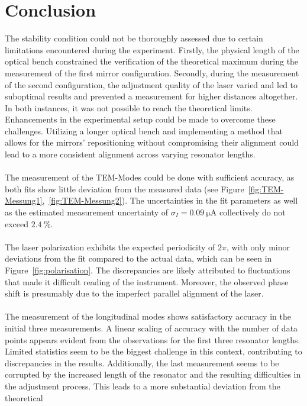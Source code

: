 \section{Conclusion}
The stability condition could not be thoroughly assessed due to certain limitations
encountered during the experiment. Firstly, the physical length of the optical bench
constrained the verification of the theoretical maximum during the measurement of the
first mirror configuration.
Secondly, during the measurement of the second configuration, the adjustment quality of
the laser varied and led to suboptimal results and prevented a measurement for higher
distances altogether. In both instances, it was not possible
to reach the theoretical limits.
Enhancements in the experimental setup could be made to overcome these challenges.
Utilizing a longer optical bench and implementing a method that allows for the mirrors’
repositioning without compromising their alignment could lead to a more consistent alignment
across varying resonator lengths.\\
\\
The measurement of the TEM-Modes could be done with sufficient accuracy, as both fits
show little deviation from the measured data (see Figure~\ref{fig:TEM-Messung1},~\ref{fig:TEM-Messung2}).
The uncertainties in the fit parameters as well as the estimated measurement uncertainty of
$\sigma_{I} = \SI{0.09}{\micro\ampere}$ collectively do not exceed $\SI{2.4}{\percent}$.\\
\\
The laser polarization exhibits the expected periodicity of $2\pi$,
with only minor deviations from the fit compared to the actual data, which can be seen
in Figure~\ref{fig:polarisation}.
The discrepancies are likely attributed to fluctuations that made it difficult reading
of the instrument. Moreover, the observed phase shift is presumably due to the imperfect
parallel alignment of the laser.\\
\\
The measurement of the longitudinal modes shows satisfactory accuracy in the initial
three measurements. A linear scaling of accuracy with the number of data points appears evident
from the observations for the first three resonator lengths. Limited statistics seem to be the
biggest challenge in this context, contributing to discrepancies in the results. Additionally,
the last measurement seems to be corrupted by the increased length of the resonator and the resulting
difficulties in the adjustment process. This leads to a more substantial deviation from the theoretical

